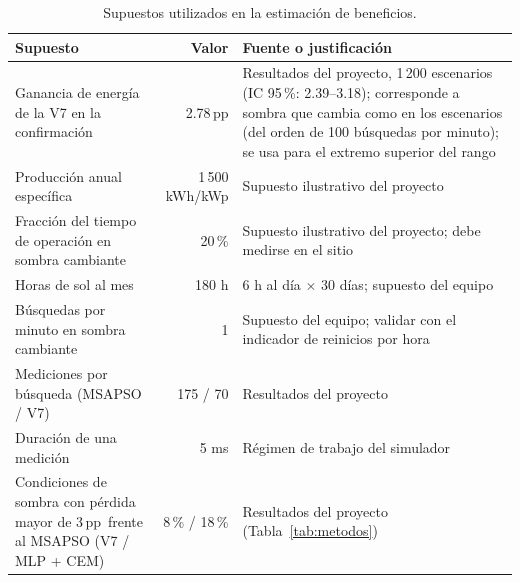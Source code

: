 \documentclass[letterpaper,11pt]{article}
\newcommand{\pp}{\,pp}
\begin{document}
\begin{table}[H]
\centering\small{}
\caption{Supuestos utilizados en la estimación de beneficios.}
\label{tab:supuestos}
\begin{tabularx}{\linewidth}{@{}Yrp{5.6cm}@{}}
\toprule
Supuesto & Valor & Fuente o justificación\\
\midrule
Ganancia de energía de la V7 en la confirmación & 2.78\pp & Resultados del proyecto, 1\,200 escenarios (IC 95\,\%: 2.39--3.18); corresponde a sombra que cambia como en los escenarios (del orden de 100 búsquedas por minuto); se usa para el extremo superior del rango\\
Producción anual específica & 1\,500 kWh/kWp & Supuesto ilustrativo del proyecto\\
Fracción del tiempo de operación en sombra cambiante & 20\,\% & Supuesto ilustrativo del proyecto; debe medirse en el sitio\\
Horas de sol al mes & 180 h & 6 h al día $\times$ 30 días; supuesto del equipo\\
Búsquedas por minuto en sombra cambiante & 1 & Supuesto del equipo; validar con el indicador de reinicios por hora\\
Mediciones por búsqueda (MSAPSO / V7) & 175 / 70 & Resultados del proyecto\\
Duración de una medición & 5 ms & Régimen de trabajo del simulador\\
Condiciones de sombra con pérdida mayor de 3\pp\ frente al MSAPSO (V7 / MLP + CEM) & 8\,\% / 18\,\% & Resultados del proyecto (Tabla~\ref{tab:metodos})\\
\bottomrule
\end{tabularx}
\end{table}
\end{document}
